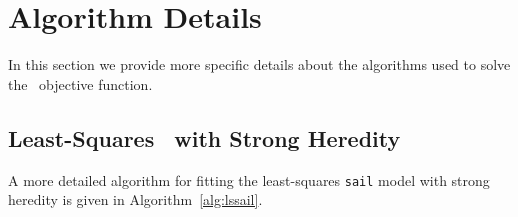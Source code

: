 \section{Algorithm Details} \label{ap:sail_algorithm}

In this section we provide more specific details about the algorithms used to solve the \sail ~objective function. 

\subsection{Least-Squares \sail ~with Strong Heredity} \label{ap:subsec:lssail}
A more detailed algorithm for fitting the least-squares \texttt{sail} model with strong heredity is given in Algorithm~\ref{alg:lssail}.


